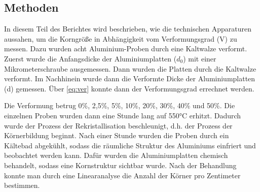 \documentclass[
	a4paper,
	12pt,
	pagesize,
	ngerman
]{scrartcl}
\begin{document}
\subsection{Methoden}
In diesem Teil des Berichtes wird beschrieben, wie die technischen Apparaturen aussahen, um die Korngröße in Abhängigkeit vom Verformungsgrad (V) zu messen. Dazu wurden acht Aluminium-Proben durch eine Kaltwalze verformt. Zuerst wurde die Anfangsdicke der Aluminiumplatten ($d_0$) mit einer Mikrometerschraube ausgemessen. Dann wurden die Platten durch die Kaltwalze verformt. Im Nachhinein wurde dann die Verformte Dicke der Aluminiumplatten (d) gemessen. Über \cref{eq:ver} konnte dann der Verformungsgrad errechnet werden.

Die Verformung betrug 0\%, 2,5\%, 5\%, 10\%, 20\%, 30\%, 40\% und 50\%.
Die einzelnen Proben wurden dann eine Stunde lang auf 550°C erhitzt. Dadurch wurde der Prozess der Rekristallisation beschleunigt, d.h. der Prozess der Körnerbildung beginnt. Nach einer Stunde wurden die Proben durch ein Kältebad abgekühlt, sodass die räumliche Struktur des Aluminiums einfriert und beobachtet werden kann. Dafür wurden die Aluminiumplatten chemisch behandelt, sodass eine Kornstruktur sichtbar wurde. Nach der Behandlung konnte man durch eine Linearanalyse die Anzahl der Körner pro Zentimeter bestimmen.
\end{document}

